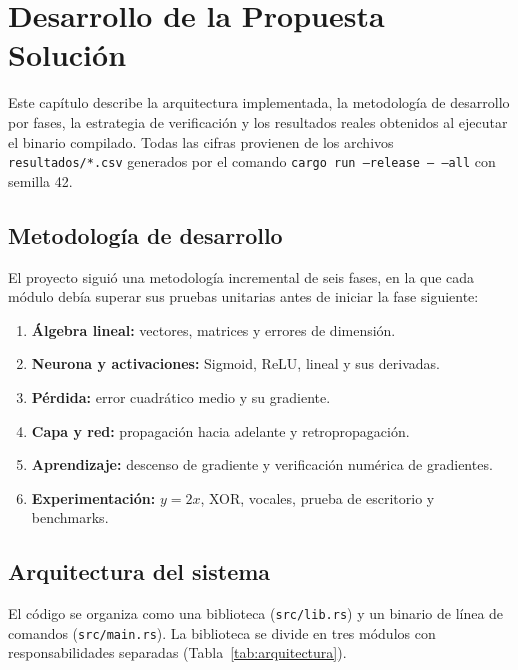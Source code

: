 \chapter{Desarrollo de la Propuesta Solución}\label{cap:propuesta}
Este capítulo describe la arquitectura implementada, la metodología de desarrollo por fases, la estrategia de verificación y los resultados reales obtenidos al ejecutar el binario compilado. Todas las cifras provienen de los archivos \texttt{resultados/*.csv} generados por el comando \texttt{cargo run --release -- --all} con semilla 42.

\section{Metodología de desarrollo}
El proyecto siguió una metodología incremental de seis fases, en la que cada módulo debía superar sus pruebas unitarias antes de iniciar la fase siguiente:
\begin{enumerate}
\item \textbf{Álgebra lineal:} vectores, matrices y errores de dimensión.
\item \textbf{Neurona y activaciones:} Sigmoid, ReLU, lineal y sus derivadas.
\item \textbf{Pérdida:} error cuadrático medio y su gradiente.
\item \textbf{Capa y red:} propagación hacia adelante y retropropagación.
\item \textbf{Aprendizaje:} descenso de gradiente y verificación numérica de gradientes.
\item \textbf{Experimentación:} $y=2x$, XOR, vocales, prueba de escritorio y benchmarks.
\end{enumerate}

\section{Arquitectura del sistema}
El código se organiza como una biblioteca (\texttt{src/lib.rs}) y un binario de línea de comandos (\texttt{src/main.rs}). La biblioteca se divide en tres módulos con responsabilidades separadas (Tabla~\ref{tab:arquitectura}).

